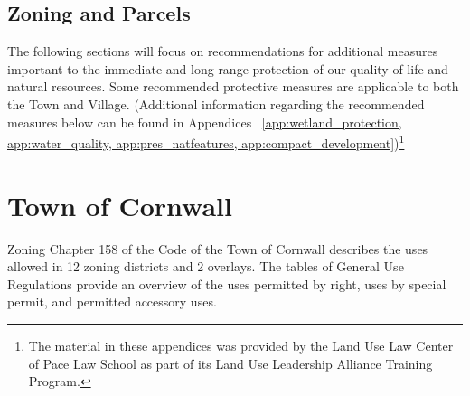 \subsection*{Zoning and Parcels}
The following sections will focus on recommendations for additional measures 
important to the immediate and long-range protection of our quality of life and 
natural resources. Some recommended protective measures are applicable to both 
the Town and Village. (Additional information regarding the recommended
measures below can be found in Appendices ~\ref{app:wetland_protection,
app:water_quality, app:pres_natfeatures, app:compact_development})\footnote{The
material in these appendices was provided by the Land Use Law Center of
Pace Law School as part of its Land Use Leadership Alliance Training Program.}

\section{Town of Cornwall}
Zoning Chapter 158 of the Code of the Town of Cornwall describes the uses 
allowed in 12 zoning districts and 2 overlays. The tables of General Use 
Regulations provide an overview of the uses permitted by right, uses by special 
permit, and permitted accessory uses.
